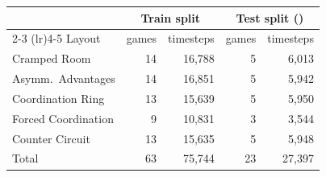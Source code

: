 \begin{tabular}{lrrrr}
\toprule
& \multicolumn{2}{c}{Train split} & \multicolumn{2}{c}{Test split (\hproxy{})} \\
\cmidrule(lr){2-3} \cmidrule(lr){4-5}
Layout & games & timesteps & games & timesteps \\
\midrule
Cramped Room & 14 & 16,788 & 5 & 6,013 \\
Asymm.\ Advantages & 14 & 16,851 & 5 & 5,942 \\
Coordination Ring & 13 & 15,639 & 5 & 5,950 \\
Forced Coordination & 9 & 10,831 & 3 & 3,544 \\
Counter Circuit & 13 & 15,635 & 5 & 5,948 \\
\midrule
Total & 63 & 75,744 & 23 & 27,397 \\
\bottomrule
\end{tabular}